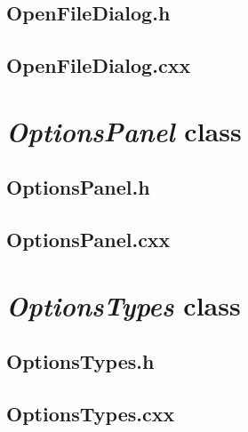\subsection{OpenFileDialog.h}


\newpage

\subsection{OpenFileDialog.cxx}


\newpage


\section{\textit{OptionsPanel} class}

\subsection{OptionsPanel.h}


\newpage

\subsection{OptionsPanel.cxx}


\newpage


\section{\textit{OptionsTypes} class}

\subsection{OptionsTypes.h}


\newpage

\subsection{OptionsTypes.cxx}

